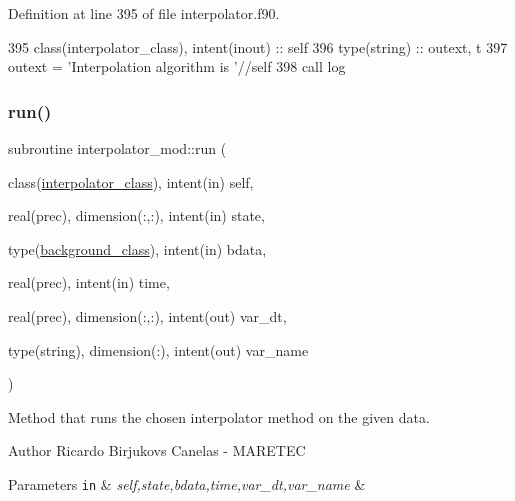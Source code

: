 Definition at line 395 of file interpolator.\+f90.


\begin{DoxyCode}
395     \textcolor{keywordtype}{class}(interpolator\_class), \textcolor{keywordtype}{intent(inout)} :: self
396     \textcolor{keywordtype}{type}(string) :: outext, t
397     outext = \textcolor{stringliteral}{'Interpolation algorithm is '}//self%
398     \textcolor{keyword}{call }log%
\end{DoxyCode}
\mbox{\label{namespaceinterpolator__mod_a53b61f6bca0d966521c68cb3ca838d93}} 
\subsubsection{\texorpdfstring{run()}{run()}}
{\footnotesize\ttfamily subroutine interpolator\+\_\+mod\+::run (\begin{DoxyParamCaption}\item[{class(\mbox{\hyperlink{structinterpolator__mod_1_1interpolator__class}{interpolator\+\_\+class}}), intent(in)}]{self,  }\item[{real(prec), dimension(\+:,\+:), intent(in)}]{state,  }\item[{type(\mbox{\hyperlink{structbackground__mod_1_1background__class}{background\+\_\+class}}), intent(in)}]{bdata,  }\item[{real(prec), intent(in)}]{time,  }\item[{real(prec), dimension(\+:,\+:), intent(out)}]{var\+\_\+dt,  }\item[{type(string), dimension(\+:), intent(out)}]{var\+\_\+name }\end{DoxyParamCaption})\hspace{0.3cm}{\ttfamily [private]}}



Method that runs the chosen interpolator method on the given data. 

\begin{DoxyAuthor}{Author}
Ricardo Birjukovs Canelas -\/ M\+A\+R\+E\+T\+EC 
\end{DoxyAuthor}

\begin{DoxyParams}[1]{Parameters}
\mbox{\tt in}  & {\em self,state,bdata,time,var\+\_\+dt,var\+\_\+name} & \\
\hline
\end{DoxyParams}


